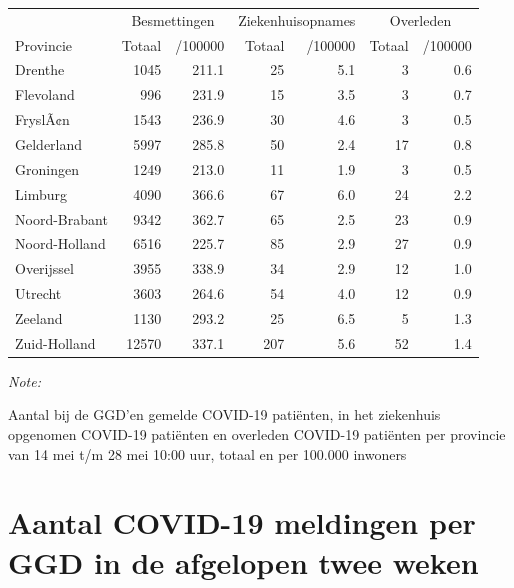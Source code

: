 \documentclass[
  english,
  man,floatsintext]{apa6}
\begin{document}
\begin{table}
\centering
\begin{threeparttable}
\begin{tabular}{lrrrrrr}
\toprule
\multicolumn{1}{c}{ } & \multicolumn{2}{c}{Besmettingen} & \multicolumn{2}{c}{Ziekenhuisopnames} & \multicolumn{2}{c}{Overleden} \\
\cmidrule(l{3pt}r{3pt}){2-3} \cmidrule(l{3pt}r{3pt}){4-5} \cmidrule(l{3pt}r{3pt}){6-7}
Provincie & Totaal & /100000 & Totaal & /100000 & Totaal & /100000\\
\midrule
Drenthe & 1045 & 211.1 & 25 & 5.1 & 3 & 0.6\\
Flevoland & 996 & 231.9 & 15 & 3.5 & 3 & 0.7\\
FryslÃ¢n & 1543 & 236.9 & 30 & 4.6 & 3 & 0.5\\
Gelderland & 5997 & 285.8 & 50 & 2.4 & 17 & 0.8\\
Groningen & 1249 & 213.0 & 11 & 1.9 & 3 & 0.5\\
Limburg & 4090 & 366.6 & 67 & 6.0 & 24 & 2.2\\
Noord-Brabant & 9342 & 362.7 & 65 & 2.5 & 23 & 0.9\\
Noord-Holland & 6516 & 225.7 & 85 & 2.9 & 27 & 0.9\\
Overijssel & 3955 & 338.9 & 34 & 2.9 & 12 & 1.0\\
Utrecht & 3603 & 264.6 & 54 & 4.0 & 12 & 0.9\\
Zeeland & 1130 & 293.2 & 25 & 6.5 & 5 & 1.3\\
Zuid-Holland & 12570 & 337.1 & 207 & 5.6 & 52 & 1.4\\
\bottomrule
\end{tabular}
\begin{tablenotes}
\item \textit{Note: } 
\item Aantal bij de GGD’en gemelde COVID-19 patiënten, in het ziekenhuis opgenomen COVID-19 patiënten en overleden COVID-19 patiënten per provincie van 14 mei t/m 28 mei 10:00 uur, totaal en per 100.000 inwoners
\end{tablenotes}
\end{threeparttable}
\end{table}

\newpage

\hypertarget{aantal-covid-19-meldingen-per-ggd-in-de-afgelopen-twee-weken}{%
\section{Aantal COVID-19 meldingen per GGD in de afgelopen twee weken}\label{aantal-covid-19-meldingen-per-ggd-in-de-afgelopen-twee-weken}}
\end{document}
